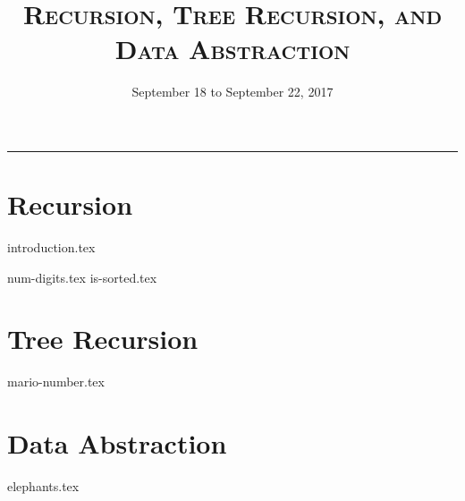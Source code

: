 \documentclass{exam}
\title{\textsc{Recursion, Tree Recursion, and Data Abstraction}}
\date{September 18 to September 22, 2017}
\begin{document}
\maketitle
\rule{\textwidth}{0.15em}
\fontsize{12}{15}\selectfont


\section{Recursion}
{introduction.tex}
\begin{questions}
{num-digits.tex}
{is-sorted.tex}
\end{questions}

\section{Tree Recursion}
\begin{questions}
{mario-number.tex}

\section{Data Abstraction}
{elephants.tex}
\end{questions}
\end{document}
